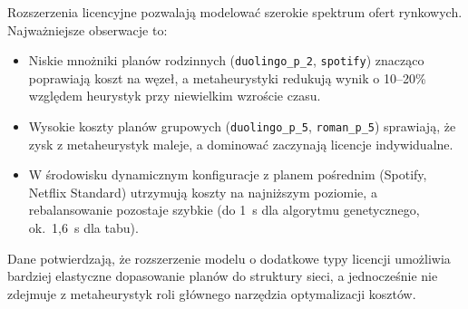 Rozszerzenia licencyjne pozwalają modelować szerokie spektrum ofert rynkowych. Najważniejsze obserwacje to:
\begin{itemize}
  \item Niskie mnożniki planów rodzinnych (\texttt{duolingo\_p\_2}, \texttt{spotify}) znacząco poprawiają koszt na węzeł, a metaheurystyki redukują wynik o 10--20\% względem heurystyk przy niewielkim wzroście czasu.
  \item Wysokie koszty planów grupowych (\texttt{duolingo\_p\_5}, \texttt{roman\_p\_5}) sprawiają, że zysk z metaheurystyk maleje, a dominować zaczynają licencje indywidualne.
  \item W środowisku dynamicznym konfiguracje z planem pośrednim (Spotify, Netflix Standard) utrzymują koszty na najniższym poziomie, a rebalansowanie pozostaje szybkie (do 1~s dla algorytmu genetycznego, ok.~1,6~s dla tabu).
\end{itemize}

Dane potwierdzają, że rozszerzenie modelu o dodatkowe typy licencji umożliwia bardziej elastyczne dopasowanie planów do struktury sieci, a jednocześnie nie zdejmuje z metaheurystyk roli głównego narzędzia optymalizacji kosztów.

